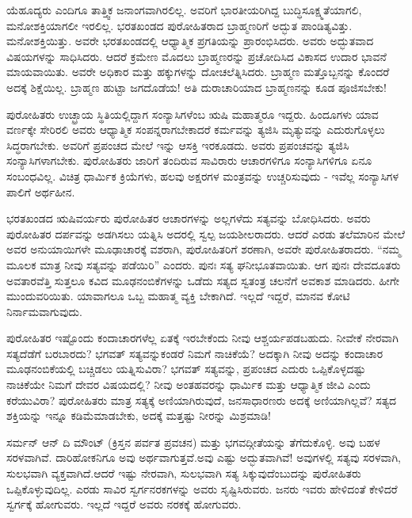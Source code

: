 ಯೆಹೂದ್ಯರು ಎಂದಿಗೂ ತಾತ್ತ್ವಿಕ ಜನಾಂಗವಾಗಿರಲಿಲ್ಲ. ಅವರಿಗೆ ಭಾರತೀಯರಿಗಿದ್ದ ಬುದ್ಧಿಸೂಕ್ಷ್ಮತೆಯಾಗಲಿ, ಮನೋಶಕ್ತಿಯಾಗಲೀ ಇರಲಿಲ್ಲ. ಭರತಖಂಡದ ಪುರೋಹಿತರಾದ ಬ್ರಾಹ್ಮಣರಿಗೆ ಅದ್ಭುತ ಪಾಂಡಿತ್ಯವಿತ್ತು. ಮನೋಶಕ್ತಿಯಿತ್ತು. ಅವರೇ ಭರತಖಂಡದಲ್ಲಿ ಆಧ್ಯಾತ್ಮಿಕ ಪ್ರಗತಿಯನ್ನು ಪ್ರಾರಂಭಿಸಿದರು. ಅವರು ಅದ್ಭುತವಾದ ವಿಷಯಗಳನ್ನು ಸಾಧಿಸಿದರು. ಆದರೆ ಕ್ರಮೇಣ ಮೊದಲು ಬ್ರಾಹ್ಮಣರನ್ನು ಪ್ರಚೋದಿಸಿದ ವಿಕಾಸದ ಉದಾರ ಭಾವನೆ ಮಾಯವಾಯಿತು. ಅವರೇ ಅಧಿಕಾರ ಮತ್ತು ಹಕ್ಕುಗಳನ್ನು ದೋಚಲೆತ್ನಿಸಿದರು. ಬ್ರಾಹ್ಮಣ ಮತ್ತೊಬ್ಬನನ್ನು ಕೊಂದರೆ ಅದಕ್ಕೆ ಶಿಕ್ಷೆಯಿಲ್ಲ. ಬ್ರಾಹ್ಮಣ ಹುಟ್ಟಾ ಜಗದೊಡೆಯ! ಅತಿ ದುರಾಚಾರಿಯಾದ ಬ್ರಾಹ್ಮಣನನ್ನು ಕೂಡ ಪೂಜಿಸಬೇಕು!

ಪುರೋಹಿತರು ಉಚ್ಛ್ರಾಯ ಸ್ಥಿತಿಯಲ್ಲಿದ್ದಾಗ ಸಂನ್ಯಾಸಿಗಳೆಂಬ ಋಷಿ ಮಹಾತ್ಮರೂ ಇದ್ದರು. ಹಿಂದೂಗಳು ಯಾವ ವರ್ಣಕ್ಕೇ ಸೇರಿರಲಿ ಅವರು ಆಧ್ಯಾತ್ಮಿಕ ಸಂಪನ್ನರಾಗ\-ಬೇಕಾದರೆ ಕರ್ಮವನ್ನು ತ್ಯಜಿಸಿ ಮೃತ್ಯುವನ್ನು ಎದುರುಗೊಳ್ಳಲು ಸಿದ್ಧರಾಗಬೇಕು. ಅವರಿಗೆ ಪ್ರಪಂಚದ ಮೇಲೆ ಇನ್ನು ಆಸಕ್ತಿ ಇರಕೂಡದು. ಅವರು ಪ್ರಪಂಚವನ್ನು ತ್ಯಜಿಸಿ ಸಂನ್ಯಾಸಿಗಳಾಗಬೇಕು. ಪುರೋಹಿತರು ಜಾರಿಗೆ ತಂದಿರುವ ಸಾವಿರಾರು ಆಚಾರಗಳಿಗೂ ಸಂನ್ಯಾಸಿಗಳಿಗೂ ಏನೂ ಸಂಬಂಧವಿಲ್ಲ. ವಿಚಿತ್ರ ಧಾರ್ಮಿಕ ಕ್ರಿಯೆಗಳು, ಹಲವು ಅಕ್ಷರಗಳ ಮಂತ್ರವನ್ನು ಉಚ್ಚರಿಸುವುದು - ಇವೆಲ್ಲ ಸಂನ್ಯಾಸಿಗಳ ಪಾಲಿಗೆ ಅರ್ಥಹೀನ.

ಭರತಖಂಡದ ಋಷಿವರ್ಯರು ಪುರೋಹಿತರ ಆಚಾರಗಳನ್ನು ಅಲ್ಲಗಳೆದು ಸತ್ಯವನ್ನು ಬೋಧಿಸಿದರು. ಅವರು ಪುರೋಹಿತರ ದರ್ಪವನ್ನು ಅಡಗಿಸಲು ಯತ್ನಿಸಿ ಅದರಲ್ಲಿ ಸ್ವಲ್ಪ ಜಯಶೀಲರಾದರು. ಆದರೆ ಎರಡು ತಲೆಮಾರಿನ ಮೇಲೆ ಅವರ ಅನುಯಾಯಿಗಳೇ ಮೂಢಾಚಾರಕ್ಕೆ ವಶರಾಗಿ, ಪುರೋಹಿತರಿಗೆ ಶರಣಾಗಿ, ಅವರೇ ಪುರೋಹಿತರಾದರು. “ನಮ್ಮ ಮೂಲಕ ಮಾತ್ರ ನೀವು ಸತ್ಯವನ್ನು ಪಡೆಯಿರಿ” ಎಂದರು. ಪುನಃ ಸತ್ಯ ಘನೀಭೂತ\-ವಾಯಿತು. ಆಗ ಪುನಃ ದೇವದೂತರು ಅವತಾರವೆತ್ತಿ ಸುತ್ತಲೂ ಕವಿದ ಮೂಢನಂಬಿಕೆಗಳನ್ನು ಒಡೆದು ಸತ್ಯದ ಸ್ವತಂತ್ರ ಚಲನೆಗೆ ಅವಕಾಶ ಮಾಡಿದರು. ಹೀಗೇ ಮುಂದುವರಿಯಿತು. ಯಾವಾಗಲೂ ಒಬ್ಬ ಮಹಾತ್ಮ ವ್ಯಕ್ತಿ ಬೇಕಾಗಿದೆ. ಇಲ್ಲದೆ ಇದ್ದರೆ, ಮಾನವ ಕೋಟಿ ನಿರ್ನಾಮವಾಗುವುದು.

ಪುರೋಹಿತರ ಇಷ್ಟೊಂದು ಕಂದಾಚಾರಗಳೆಲ್ಲ ಏತಕ್ಕೆ ಇರಬೇಕೆಂದು ನೀವು ಆಶ್ಚರ್ಯಪಡಬಹುದು. ನೀವೇಕೆ ನೇರವಾಗಿ ಸತ್ಯದೆಡೆಗೆ ಬರಬಾರದು? ಭಗವತ್​ ಸತ್ಯವನ್ನು\break ಕಂಡರೆ ನಿಮಗೆ ನಾಚಿಕೆಯೆ? ಅದಕ್ಕಾಗಿ ನೀವು ಅದನ್ನು ಕಂದಾಚಾರ ಮೂಢನಂಬಿಕೆಯಲ್ಲಿ ಬಚ್ಚಿಡಲು ಯತ್ನಿಸುವಿರಾ? ಭಗವತ್​ ಸತ್ಯವನ್ನು, ಪ್ರಪಂಚದ ಎದುರು ಒಪ್ಪಿಕೊಳ್ಳದಷ್ಟು ನಾಚಿಕೆಯೇ ನಿಮಗೆ ದೇವರ ವಿಷಯದಲ್ಲಿ? ನೀವು ಅಂತಹವರನ್ನು ಧಾರ್ಮಿಕ ಮತ್ತು ಆಧ್ಯಾತ್ಮಿಕ ಜೀವಿ ಎಂದು ಕರೆಯುವಿರಾ? ಪುರೋಹಿತರು ಮಾತ್ರ ಸತ್ಯಕ್ಕೆ ಅಣಿಯಾಗಿರುವುದೆ, ಜನಸಾಧಾರಣರು ಅದಕ್ಕೆ ಅಣಿಯಾಗಿಲ್ಲವೆ? ಸತ್ಯದ ಶಕ್ತಿಯನ್ನು ಇನ್ನೂ ಕಡಿಮೆಮಾಡಬೇಕು, ಅದಕ್ಕೆ ಮತ್ತಷ್ಟು ನೀರನ್ನು ಮಿಶ್ರಮಾಡಿ!

ಸರ್ಮನ್​ ಆನ್​ ದಿ ಮೌಂಟ್​ (ಕ್ರಿಸ್ತನ ಪರ್ವತ ಪ್ರವಚನ) ಮತ್ತು ಭಗವದ್ಗೀತೆಯನ್ನು ತೆಗೆದುಕೊಳ್ಳಿ. ಅವು ಬಹಳ ಸರಳವಾಗಿವೆ. ದಾರಿಹೋಕನಿಗೂ ಅವು ಅರ್ಥವಾಗುತ್ತವೆ.\break ಅವು ಎಷ್ಟು ಅದ್ಭುತವಾಗಿವೆ! ಅವುಗಳಲ್ಲಿ ಸತ್ಯವು ಸರಳವಾಗಿ, ಸುಲಭವಾಗಿ ವ್ಯಕ್ತವಾಗಿದೆ.\break ಆದರೆ ಇಷ್ಟು ನೇರವಾಗಿ, ಸುಲಭವಾಗಿ ಸತ್ಯ ಸಿಕ್ಕುವುದೆಂಬುದನ್ನು ಪುರೋಹಿತರು ಒಪ್ಪಿಕೊಳ್ಳುವು\-ದಿಲ್ಲ. ಎರಡು ಸಾವಿರ ಸ್ವರ್ಗನರಕಗಳನ್ನು ಅವರು ಸೃಷ್ಟಿಸಿರುವರು. ಜನರು ಇವರು ಹೇಳಿದಂತೆ ಕೇಳಿದರೆ ಸ್ವರ್ಗಕ್ಕೆ ಹೋಗುವರು. ಇಲ್ಲದೆ ಇದ್ದರೆ ಅವರು ನರಕಕ್ಕೆ ಹೋಗುವರು.

